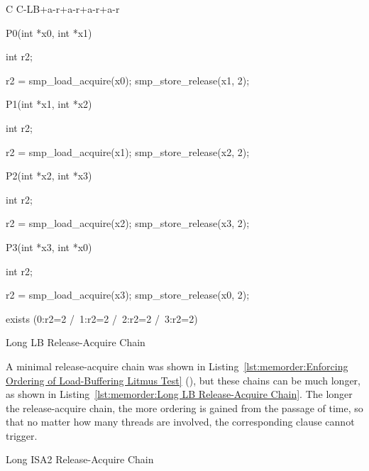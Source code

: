 \begin{listing}[tbp]
{ \scriptsize
\begin{verbbox}[\LstLineNo]
C C-LB+a-r+a-r+a-r+a-r
{
}

P0(int *x0, int *x1)
{
  int r2;

  r2 = smp_load_acquire(x0);
  smp_store_release(x1, 2);
}


P1(int *x1, int *x2)
{
  int r2;

  r2 = smp_load_acquire(x1);
  smp_store_release(x2, 2);
}

P2(int *x2, int *x3)
{
  int r2;

  r2 = smp_load_acquire(x2);
  smp_store_release(x3, 2);
}

P3(int *x3, int *x0)
{
  int r2;

  r2 = smp_load_acquire(x3);
  smp_store_release(x0, 2);
}

exists (0:r2=2 /\ 1:r2=2 /\ 2:r2=2 /\ 3:r2=2)
\end{verbbox}
}
\centering
\theverbbox
\caption{Long LB Release-Acquire Chain}
\label{lst:memorder:Long LB Release-Acquire Chain}
\end{listing}

A minimal release-acquire chain was shown in
Listing~\ref{lst:memorder:Enforcing Ordering of Load-Buffering Litmus Test}
(),
but these chains can be much longer, as shown in
Listing~\ref{lst:memorder:Long LB Release-Acquire Chain}.
The longer the release-acquire chain, the more ordering is gained
from the passage of time, so that no matter how many threads are
involved, the corresponding  clause cannot trigger.

\begin{listing}[tbp]

\caption{Long ISA2 Release-Acquire Chain}
\label{lst:memorder:Long ISA2 Release-Acquire Chain}
\end{listing}

